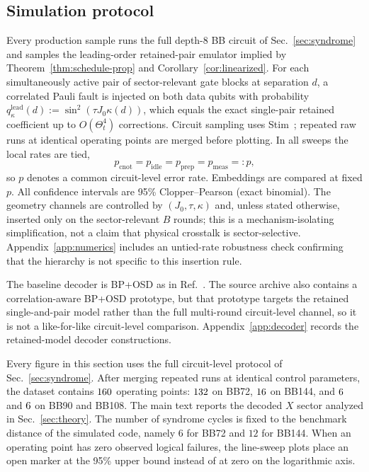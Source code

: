 \documentclass[
aps,
prx,
10pt,
twocolumn,
groupedaddress,
longbibliography,
nofootinbib,
floatfix
]{revtex4-2}
\theoremstyle{definition}
\begin{document}
\subsection{Simulation protocol}

Every production sample runs the full depth-$8$ BB circuit of Sec.~\ref{sec:syndrome} and samples the leading-order retained-pair emulator implied by Theorem~\ref{thm:schedule-prop} and Corollary~\ref{cor:linearized}. For each simultaneously active pair of sector-relevant gate blocks at separation $d$, a correlated Pauli fault is injected on both data qubits with probability $q_\kappa^{\mathrm{lead}}(d):=\sin^2(\tau J_0\kappa(d))$, which equals the exact single-pair retained coefficient up to $O(\Theta_t^4)$ corrections. Circuit sampling uses Stim~\cite{gidney_stim_2021}; repeated raw runs at identical operating points are merged before plotting. In all sweeps the local rates are tied,
\begin{equation}
p_{\mathrm{cnot}}=p_{\mathrm{idle}}=p_{\mathrm{prep}}=p_{\mathrm{meas}}=:p,
\end{equation}
so $p$ denotes a common circuit-level error rate. Embeddings are compared at fixed $p$. All confidence intervals are 95\% Clopper--Pearson (exact binomial). The geometry channels are controlled by $(J_0,\tau,\kappa)$ and, unless stated otherwise, inserted only on the sector-relevant $B$ rounds; this is a mechanism-isolating simplification, not a claim that physical crosstalk is sector-selective. Appendix~\ref{app:numerics} includes an untied-rate robustness check confirming that the hierarchy is not specific to this insertion rule.

The baseline decoder is BP+OSD as in Ref.~. The source archive also contains a correlation-aware BP+OSD prototype, but that prototype targets the retained single-and-pair model rather than the full multi-round circuit-level channel, so it is not a like-for-like circuit-level comparison. Appendix~\ref{app:decoder} records the retained-model decoder constructions.

Every figure in this section uses the full circuit-level protocol of Sec.~\ref{sec:syndrome}. After merging repeated runs at identical control parameters, the dataset contains $160{}$ operating points: $132{}$ on BB72, $16{}$ on BB144, and $6{}$ and $6{}$ on BB90 and BB108. The main text reports the decoded $X$ sector analyzed in Sec.~\ref{sec:theory}. The number of syndrome cycles is fixed to the benchmark distance of the simulated code, namely $6$ for BB72 and $12$ for BB144. When an operating point has zero observed logical failures, the line-sweep plots place an open marker at the 95\% upper bound instead of at zero on the logarithmic axis.
\end{document}
